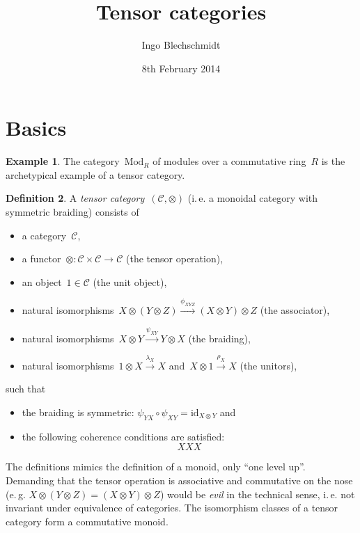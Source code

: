 \documentclass[a4paper,english,12pt]{scrartcl}
\theoremstyle{definition}
\newtheorem{defn}{Definition}[section]
\newtheorem{ex}[defn]{Example}
\theoremstyle{plain}
\theoremstyle{remark}
\newcommand{\C}{\mathcal{C}}
\newcommand{\id}{\mathrm{id}}
\newcommand{\xra}[1]{\xrightarrow{#1}}
\renewcommand{\_}{\mathpunct{.}\,}
\newcommand{\?}{\,{:}\,}
\newcommand{\Mod}{\mathrm{Mod}}
\begin{document}
\title{Tensor categories}
\author{Ingo Blechschmidt}
\date{8th February 2014}
\maketitle


\section{Basics}

\begin{ex}The category~$\Mod_R$ of modules over a commutative ring~$R$ is the
archetypical example of a tensor category.\end{ex}

\begin{defn}A \emph{tensor category}~$(\C,\otimes)$ (i.\,e. a monoidal category with
symmetric braiding) consists of
\begin{itemize}
\item a category~$\C$,
\item a functor~${\otimes} : \C \times \C \to \C$ (the tensor operation),
\item an object~$1 \in \C$ (the unit object),
\item natural isomorphisms~$X \otimes (Y \otimes Z) \xra{\phi_{XYZ}} (X \otimes
Y) \otimes Z$ (the associator),
\item natural isomorphisms~$X \otimes Y \xra{\psi_{XY}} Y \otimes X$ (the
braiding),
\item natural isomorphisms~$1 \otimes X \xra{\lambda_X} X$ and~$X \otimes 1
\xra{\rho_X} X$ (the unitors),
\end{itemize}
such that
\begin{itemize}
\item the braiding is symmetric: $\psi_{YX} \circ \psi_{XY} = \id_{X \otimes
Y}$ and
\item the following coherence conditions are satisfied:
\[ XXX \]
\end{itemize}
\end{defn}

The definitions mimics the definition of a monoid, only ``one level up''.
Demanding that the tensor operation is associative and commutative on the nose
(e.\,g. $X \otimes (Y \otimes Z) = (X \otimes Y) \otimes Z$) would be
\emph{evil} in the technical sense, i.\,e. not invariant under equivalence of
categories. The isomorphism classes of a tensor category form a commutative
monoid.
\end{document}
